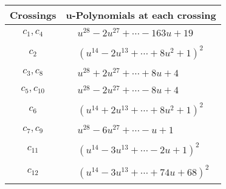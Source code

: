\documentclass[1p]{elsarticle_modified}
\theoremstyle{definition}
\begin{document}
\begin{tabular}{m{50pt}|m{274pt}}
Crossings & \hspace{64pt}u-Polynomials at each crossing \\
\hline $$\begin{aligned}c_{1},c_{4}\end{aligned}$$&$\begin{aligned}
&u^{28}-2 u^{27}+\cdots-163 u+19
\end{aligned}$\\
\hline $$\begin{aligned}c_{2}\end{aligned}$$&$\begin{aligned}
&(u^{14}-2 u^{13}+\cdots+8 u^2+1)^{2}
\end{aligned}$\\
\hline $$\begin{aligned}c_{3},c_{8}\end{aligned}$$&$\begin{aligned}
&u^{28}+2 u^{27}+\cdots+8 u+4
\end{aligned}$\\
\hline $$\begin{aligned}c_{5},c_{10}\end{aligned}$$&$\begin{aligned}
&u^{28}-2 u^{27}+\cdots-8 u+4
\end{aligned}$\\
\hline $$\begin{aligned}c_{6}\end{aligned}$$&$\begin{aligned}
&(u^{14}+2 u^{13}+\cdots+8 u^2+1)^{2}
\end{aligned}$\\
\hline $$\begin{aligned}c_{7},c_{9}\end{aligned}$$&$\begin{aligned}
&u^{28}-6 u^{27}+\cdots- u+1
\end{aligned}$\\
\hline $$\begin{aligned}c_{11}\end{aligned}$$&$\begin{aligned}
&(u^{14}-3 u^{13}+\cdots-2 u+1)^{2}
\end{aligned}$\\
\hline $$\begin{aligned}c_{12}\end{aligned}$$&$\begin{aligned}
&(u^{14}-3 u^{13}+\cdots+74 u+68)^{2}
\end{aligned}$\\
\hline
\end{tabular}\\~\\
\end{document}
